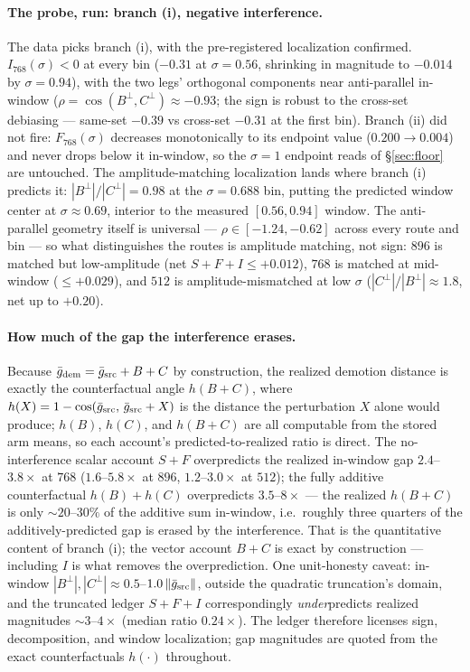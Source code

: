 \paragraph{The probe, run: branch (i), negative interference.}
The data picks branch (i), with the pre-registered localization
confirmed. $I_{768}(\sigma) < 0$ at every bin ($-0.31$ at
$\sigma = 0.56$, shrinking in magnitude to $-0.014$ by
$\sigma = 0.94$), with the two legs' orthogonal components near
anti-parallel in-window
($\rho = \cos(B^{\perp}, C^{\perp}) \approx -0.93$; the sign is robust
to the cross-set debiasing --- same-set $-0.39$ vs cross-set $-0.31$
at the first bin). Branch (ii) did not fire: $F_{768}(\sigma)$
decreases monotonically to its endpoint value ($0.200 \to 0.004$) and
never drops below it in-window, so the $\sigma{=}1$ endpoint reads of
\S\ref{sec:floor} are untouched. The amplitude-matching localization
lands where branch (i) predicts it: $|B^{\perp}|/|C^{\perp}| = 0.98$
at the $\sigma = 0.688$ bin, putting the predicted window center at
$\sigma \approx 0.69$, interior to the measured $[0.56, 0.94]$ window.
The anti-parallel geometry itself is universal ---
$\rho \in [-1.24, -0.62]$ across every route and bin --- so what
distinguishes the routes is amplitude matching, not sign: $896$ is
matched but low-amplitude (net $S{+}F{+}I \le +0.012$), $768$ is
matched at mid-window ($\le +0.029$), and $512$ is
amplitude-mismatched at low $\sigma$
($|C^{\perp}|/|B^{\perp}| \approx 1.8$, net up to $+0.20$).

\paragraph{How much of the gap the interference erases.}
Because $\bar g_{\mathrm{dem}} = \bar g_{\mathrm{src}} + B + C$ by
construction, the realized demotion distance is exactly the
counterfactual angle $h(B{+}C)$, where
$h(X) = 1 - \cos(\bar g_{\mathrm{src}},\, \bar g_{\mathrm{src}} + X)$ is the distance
the perturbation $X$ alone would produce; $h(B)$, $h(C)$, and
$h(B{+}C)$ are all computable from the stored arm means, so each
account's predicted-to-realized ratio is direct. The no-interference
scalar account $S{+}F$ overpredicts the realized in-window gap
$2.4$--$3.8\times$ at $768$ ($1.6$--$5.8\times$ at $896$,
$1.2$--$3.0\times$ at $512$); the fully additive counterfactual
$h(B) + h(C)$ overpredicts $3.5$--$8\times$ --- the realized
$h(B{+}C)$ is only ${\sim}20$--$30\%$ of the additive sum in-window,
i.e.\ roughly three quarters of the additively-predicted gap is
erased by the interference. That is the quantitative content of
branch (i); the vector account $B{+}C$ is exact by construction ---
including $I$ is what removes the overprediction. One unit-honesty
caveat: in-window $|B^{\perp}|, |C^{\perp}| \approx
0.5$--$1.0\,\|\bar g_{\mathrm{src}}\|$, outside the quadratic truncation's
domain, and the truncated ledger $S{+}F{+}I$ correspondingly
\emph{under}predicts realized magnitudes ${\sim}3$--$4\times$ (median
ratio $0.24\times$). The ledger therefore licenses sign,
decomposition, and window localization; gap magnitudes are quoted
from the exact counterfactuals $h(\cdot)$ throughout.

